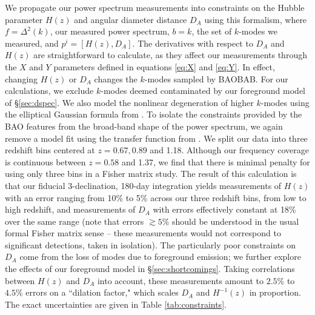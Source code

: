 \documentclass[10pt,iop]{emulateapj}
\begin{document}
We propagate our power spectrum measurements into constraints on the Hubble parameter $H(z)$
and angular diameter distance $D_A$
using this formalism, where $f = \Delta^2(k)$, our measured power spectrum, $b = k$, the set
of $k$-modes we measured, and $p^i = [H(z),D_A]$.
The derivatives with respect to $D_A$ and $H(z)$ are straightforward to calculate, as they affect
our measurements through the $X$ and $Y$ parameters defined in equations \ref{eq:X} and \ref{eq:Y}.
In effect, changing $H(z)$ or $D_A$ changes the $k$-modes sampled by BAOBAB.
For our calculations, we exclude $k$-modes deemed contaminated by our foreground
model of \S\ref{sec:dspec}.  We also model the nonlinear degeneration of higher $k$-modes
using the elliptical Gaussian formula from \citet{seo_and_eisenstein_2007}.
To isolate the constraints provided by the BAO features from the broad-band shape of the
power spectrum, we again remove a model fit using the transfer function from
\citet{eisenstein_and_hu_1998}.  We split our data into three redshift bins centered at 
$z = 0.67,0.89$ and 1.18.  Although our frequency coverage is continuous between 
$z = 0.58$ and 1.37, we find that there is minimal penalty for using only three bins in a Fisher matrix
study.  The result of this calculation is that our fiducial 3-declination, 180-day 
integration yields measurements of 
$H(z)$ with an error ranging from 10\% to 5\% across our three redshift bins, from low to high redshift, and measurements of $D_A$ with errors effectively constant at 18\% over the same range
(note that errors $\gtrsim 5$\% should
be understood in the usual formal Fisher matrix sense -- these measurements
would not correspond to significant detections, taken in isolation).  
The particularly poor constraints on $D_A$ come from the loss of modes due to foreground emission;
we further explore the effects of our foreground model in \S\ref{sec:shortcomings}.
Taking
correlations between $H(z)$ and $D_A$ into account, these measurements amount to $2.5\%$ to $4.5\%$
errors on a ``dilation factor," which scales $D_A$ and $H^{-1}(z)$ in proportion.
The exact uncertainties are given in Table \ref{tab:constraints}.
\end{document}
